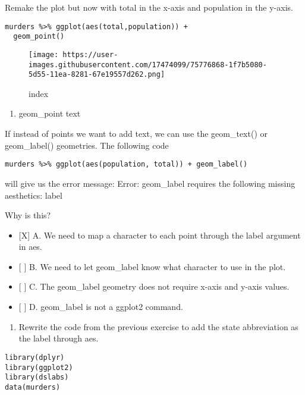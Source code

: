 \documentclass[]{article}
\providecommand{\tightlist}{%
  \setlength{\itemsep}{0pt}\setlength{\parskip}{0pt}}
\begin{document}
Remake the plot but now with total in the x-axis and population in the
y-axis.

\begin{verbatim}
murders %>% ggplot(aes(total,population)) +
  geom_point()
\end{verbatim}

\begin{figure}
\centering
\texttt{[image: https://user-images.githubusercontent.com/17474099/75776868-1f7b5080-5d55-11ea-8281-67e19557d262.png]}
\caption{index}
\end{figure}

\begin{enumerate}
\def\labelenumi{\arabic{enumi}.}
\setcounter{enumi}{6}
\tightlist
\item
  geom\_point text
\end{enumerate}

If instead of points we want to add text, we can use the geom\_text() or
geom\_label() geometries. The following code

\begin{verbatim}
murders %>% ggplot(aes(population, total)) + geom_label()
\end{verbatim}

will give us the error message: Error: geom\_label requires the
following missing aesthetics: label

Why is this?

\begin{itemize}
\tightlist
\item
  {[}X{]} A. We need to map a character to each point through the label
  argument in aes.
\item
  {[} {]} B. We need to let geom\_label know what character to use in
  the plot.
\item
  {[} {]} C. The geom\_label geometry does not require x-axis and y-axis
  values.
\item
  {[} {]} D. geom\_label is not a ggplot2 command.
\end{itemize}

\begin{enumerate}
\def\labelenumi{\arabic{enumi}.}
\setcounter{enumi}{7}
\tightlist
\item
  Rewrite the code from the previous exercise to add the state
  abbreviation as the label through aes.
\end{enumerate}

\begin{verbatim}
library(dplyr)
library(ggplot2)
library(dslabs)
data(murders)
\end{verbatim}
\end{document}
